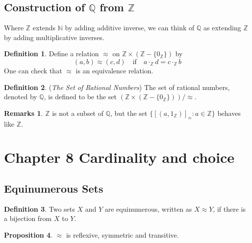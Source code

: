 \documentclass[14pt]{article}
\theoremstyle{definition}
\newtheorem*{remark}{Remarks}
\newtheorem{definition}{Definition}[subsection]
\newtheorem{proposition}[definition]{Proposition}
\newcommand{\bb}[1]{\mathbb{#1}}
\begin{document}
\subsection{Construction of $\bb{Q}$ from $\bb{Z}$}
Where $\bb{Z}$ extends $\bb{N}$ by adding additive inverse, we can think of $\bb{Q}$ as 
extending $\bb{Z}$ by adding multiplicative inverses.

\begin{definition}
    Define a relation $\approx$ on $\bb{Z}\times (\bb{Z}-\{0_{\bb{Z}}\})$ by
    \begin{equation*}
        (a,b)\approx (c,d)\quad \mathrm{if} \quad a\cdot_{\bb{Z}}d=c\cdot_{\bb{Z}}b
    \end{equation*}
    One can check that $\approx$ is an equivalence relation.
\end{definition}

\begin{definition}
    (\textit{The Set of Rational Numbers}) The set of rational numbers, denoted by $\bb{Q}$, is
     defined to be the set $(\bb{Z}\times (\bb{Z}-\{0_{\bb{Z}}\}))/\approx$.
\end{definition}
\begin{remark}
    $\bb{Z}$ is not a subset of $\bb{Q}$, but the set $\{[(a,1_{\bb{Z}})]_{\approx}\colon a\in \bb{Z}\}$
    behaves like $\bb{Z}$.
\end{remark}

\newpage

\section{Chapter 8 Cardinality and choice}

\subsection{Equinumerous Sets}
\begin{definition}
    Two sets $X$ and $Y$ are equinumerous, written as $X\approx Y$,  if there is a bijection
    from $X$ to $Y$.
\end{definition}
\vspace{2mm}
\begin{proposition}
    $\approx$ is reflexive, symmetric and transitive.
\end{proposition}
\end{document}
